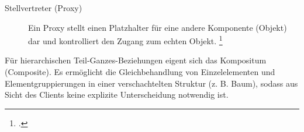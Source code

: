 \documentclass{lehramt-informatik-aufgabe}
\begin{document}
\begin{enumerate}
\begin{liAntwort}
\begin{description}
\item[Stellvertreter (Proxy)]
Ein Proxy stellt einen Platzhalter für eine andere Komponente (Objekt)
dar und kontrolliert den Zugang zum echten Objekt.
\footcite[Seite 89]{eilebrecht}
\end{description}

Für hierarchischen Teil-Ganzes-Beziehungen eigent sich das Kompositum
(Composite). Es ermöglicht die Gleichbehandlung von Einzelelementen und
Elementgruppierungen in einer verschachtelten Struktur (z. B. Baum),
sodass aus Sicht des Clients keine explizite Unterscheidung notwendig
ist.
\end{liAntwort}
\end{enumerate}

\begin{liAdditum}

\end{liAdditum}
\end{document}
